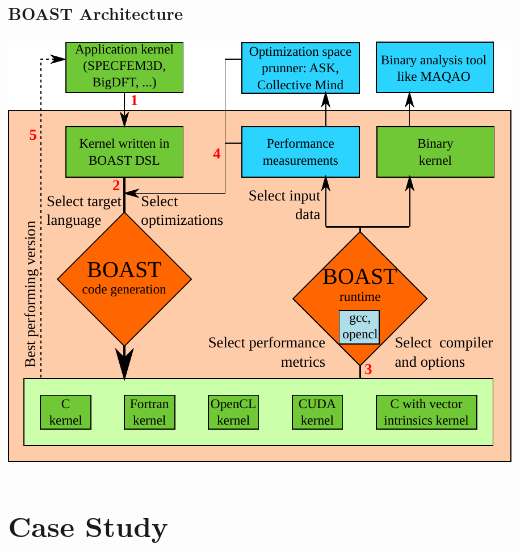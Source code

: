 \documentclass{beamer}
\begin{document}
\begin{frame}
\frametitle{BOAST Architecture}
 \begin{center}
   \includegraphics[scale=0.5]{BOAST_Workflow}
 \end{center}
\end{frame}

\section{Case Study}
\end{document}
